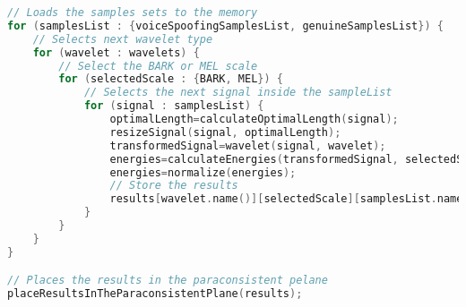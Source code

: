 \begin{lstlisting}[language=C++, caption={Procedure 1 algorithm}, label={lst:experiment01Algo}]
// Loads the samples sets to the memory
for (samplesList : {voiceSpoofingSamplesList, genuineSamplesList}) {
	// Selects next wavelet type
	for (wavelet : wavelets) {
		// Select the BARK or MEL scale
		for (selectedScale : {BARK, MEL}) {
			// Selects the next signal inside the sampleList
			for (signal : samplesList) {
				optimalLength=calculateOptimalLength(signal);
				resizeSignal(signal, optimalLength);
				transformedSignal=wavelet(signal, wavelet);
				energies=calculateEnergies(transformedSignal, selectedScale);
				energies=normalize(energies);
				// Store the results
				results[wavelet.name()][selectedScale][samplesList.name()].add(energies);
			}
		}
	}
}

// Places the results in the paraconsistent pelane
placeResultsInTheParaconsistentPlane(results);
\end{lstlisting}